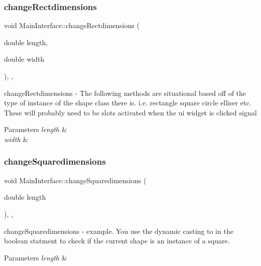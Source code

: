 \subsubsection{\texorpdfstring{change\+Rectdimensions}{changeRectdimensions}}
{\footnotesize\ttfamily void Main\+Interface\+::change\+Rectdimensions (\begin{DoxyParamCaption}\item[{double}]{length,  }\item[{double}]{width }\end{DoxyParamCaption})\hspace{0.3cm}{\ttfamily [inline]}, {\ttfamily [protected]}, {\ttfamily [slot]}}



change\+Rectdimensions -\/ The following methods are situational based off of the type of instance of the shape class there is. i.\+e. rectangle square circle elliser etc. These will probably need to be slots activated when the ui widget is clicked signal 


\begin{DoxyParams}{Parameters}
{\em length} & \\
\hline
{\em width} & \\
\hline
\end{DoxyParams}
\mbox{\label{class_main_interface_a0331ae438758b87a4658a227d35e39dc}} 
\subsubsection{\texorpdfstring{change\+Squaredimensions}{changeSquaredimensions}}
{\footnotesize\ttfamily void Main\+Interface\+::change\+Squaredimensions (\begin{DoxyParamCaption}\item[{double}]{length }\end{DoxyParamCaption})\hspace{0.3cm}{\ttfamily [inline]}, {\ttfamily [protected]}, {\ttfamily [slot]}}



change\+Squaredimensions -\/ example. You use the dynamic casting to in the boolean statment to check if the current shape is an instance of a square. 


\begin{DoxyParams}{Parameters}
{\em length} & \\
\hline
\end{DoxyParams}
\mbox{\label{class_main_interface_a4ccc1a9e32a7ad88caceb2acde07c565}} 
